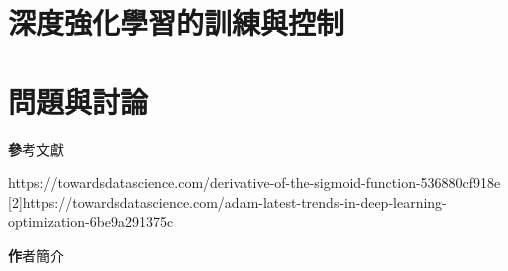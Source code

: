 \documentclass[14pt,a4paper]{report}  %
\begin{document}
\chapter{深度強化學習的訓練與控制}
\newpage
\chapter{問題與討論}

\newpage
\begin{center}
\LARGE\textbf 參考文獻\\
\end{center}
\begin{flushleft}
\begin{Large}
[1]\quad https://towardsdatascience.com/derivative-of-the-sigmoid-function-536880cf918e\\

[2]\quad https://towardsdatascience.com/adam-latest-trends-in-deep-learning-optimization-6be9a291375c\\
\end{Large}
\end{flushleft}
\newpage
\begin{center}
\LARGE\textbf 作者簡介\\
\end{center}

\end{document}
